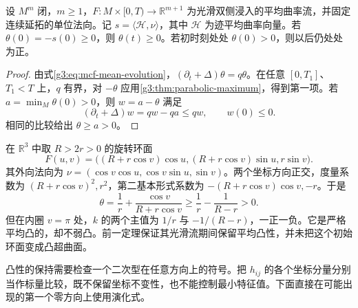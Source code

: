 \begin{theorem}\label{g3:thm:mcf-mean-convexity}
	设 \(M^m\) 闭，\(m\ge1\)，\(F:M\times[0,T)\to\mathbb R^{m+1}\) 为光滑双侧浸入的平均曲率流，并固定连续延拓的单位法向。记 \(s=\langle\mathcal H,\nu\rangle\)，其中 \(\mathcal H\) 为迹平均曲率向量。若 \(\theta(0)=-s(0)\ge0\)，则 \(\theta(t)\ge0\)。若初时刻处处 \(\theta(0)>0\)，则以后仍处处为正。
\end{theorem}
\begin{proof}
	由式\eqref{g3:eq:mcf-mean-evolution}，\((\partial_t+\Delta)\theta=q\theta\)。在任意 \([0,T_1]\)、\(T_1<T\) 上，\(q\) 有界，对 \(-\theta\) 应用\cref{g3:thm:parabolic-maximum}，得到第一项。若 \(a=\min_M\theta(0)>0\)，则 \(w=a-\theta\) 满足
	\[
		(\partial_t+\Delta)w=q w-q a\le q w,
		\qquad w(0)\le0.
	\]
	相同的比较给出 \(\theta\ge a>0\)。
\end{proof}

\begin{example}\label{g3:exm:mcf-mean-convex-torus}
	在 \(\mathbb R^3\) 中取 \(R>2r>0\) 的旋转环面
	\[
		F(u,v)=\bigl((R+r\cos v)\cos u,(R+r\cos v)\sin u,r\sin v\bigr).
	\]
	其外向法向为 \(\nu=(\cos v\cos u,\cos v\sin u,\sin v)\)。两个坐标方向正交，度量系数为 \((R+r\cos v)^2,r^2\)，第二基本形式系数为 \(-(R+r\cos v)\cos v,-r\)。于是
	\[
		\theta=\frac1r+\frac{\cos v}{R+r\cos v}
		\ge\frac1r-\frac1{R-r}>0.
	\]
	但在内圈 \(v=\pi\) 处，\(k\) 的两个主值为 \(1/r\) 与 \(-1/(R-r)\)，一正一负。它是严格平均凸的，却不弱凸。前一定理保证其光滑流期间保留平均凸性，并未把这个初始环面变成凸超曲面。
\end{example}

凸性的保持需要检查一个二次型在任意方向上的符号。把 \(h_{ij}\) 的各个坐标分量分别当作标量比较，既不保留坐标不变性，也不能控制最小特征值。下面直接在可能出现的第一个零方向上使用演化式。

